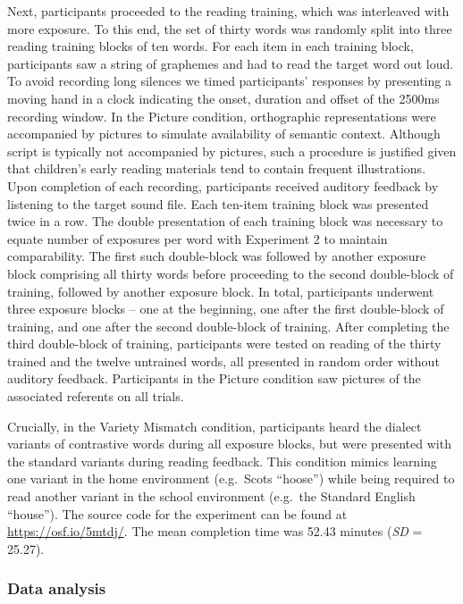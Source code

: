 \documentclass[doc,floatsintext]{apa6}
\begin{document}
Next, participants proceeded to the reading training, which was
interleaved with more exposure. To this end, the set of thirty words was
randomly split into three reading training blocks of ten words. For each
item in each training block, participants saw a string of graphemes and
had to read the target word out loud. To avoid recording long silences
we timed participants' responses by presenting a moving hand in a clock
indicating the onset, duration and offset of the 2500ms recording
window. In the Picture condition, orthographic representations were
accompanied by pictures to simulate availability of semantic context.
Although script is typically not accompanied by pictures, such a
procedure is justified given that children's early reading materials
tend to contain frequent illustrations. Upon completion of each
recording, participants received auditory feedback by listening to the
target sound file. Each ten-item training block was presented twice in a
row. The double presentation of each training block was necessary to
equate number of exposures per word with Experiment 2 to maintain
comparability. The first such double-block was followed by another
exposure block comprising all thirty words before proceeding to the
second double-block of training, followed by another exposure block. In
total, participants underwent three exposure blocks -- one at the
beginning, one after the first double-block of training, and one after
the second double-block of training. After completing the third
double-block of training, participants were tested on reading of the
thirty trained and the twelve untrained words, all presented in random
order without auditory feedback. Participants in the Picture condition
saw pictures of the associated referents on all trials.

Crucially, in the Variety Mismatch condition, participants heard the
dialect variants of contrastive words during all exposure blocks, but
were presented with the standard variants during reading feedback. This
condition mimics learning one variant in the home environment
(e.g.~Scots \enquote{hoose}) while being required to read another
variant in the school environment (e.g.~the Standard English
\enquote{house}). The source code for the experiment can be found at
\url{https://osf.io/5mtdj/}. The mean completion time was 52.43 minutes
(\emph{SD} = 25.27).

\subsubsection{Data analysis}\label{data-analysis}
\end{document}

